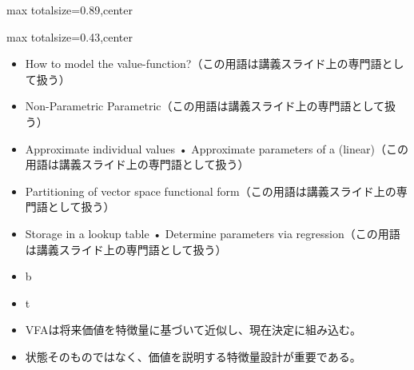 \begin{minipage}[t]{0.58\textwidth}
\begin{adjustbox}{max totalsize={\textwidth}{0.89\textheight},center}
\begin{minipage}{\textwidth}
\end{minipage}
\end{adjustbox}
\end{minipage}


\clearpage
{}
\begin{minipage}[t]{0.405\textwidth}
\begin{adjustbox}{max totalsize={\textwidth}{0.43\textheight},center}
\begin{minipage}{\textwidth}\scriptsize
{}\begin{itemize}
\item How to model the value-function?（この用語は講義スライド上の専門語として扱う）
\item Non-Parametric Parametric（この用語は講義スライド上の専門語として扱う）
\item Approximate individual values • Approximate parameters of a (linear)（この用語は講義スライド上の専門語として扱う）
\item Partitioning of vector space functional form（この用語は講義スライド上の専門語として扱う）
\item Storage in a lookup table • Determine parameters via regression（この用語は講義スライド上の専門語として扱う）
\item b
\item t
\end{itemize}\begin{itemize}
\item VFAは将来価値を特徴量に基づいて近似し、現在決定に組み込む。
\item 状態そのものではなく、価値を説明する特徴量設計が重要である。
\end{itemize}
\end{minipage}
\end{adjustbox}
\end{minipage}\hfill
